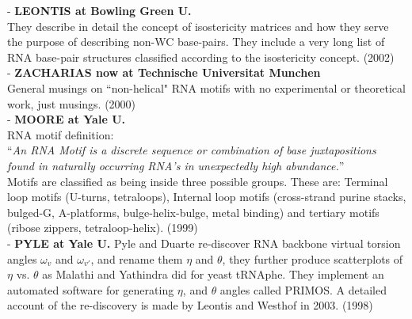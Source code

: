 - \textbf{LEONTIS at Bowling Green U.}\\
They describe in detail the concept of isostericity matrices and how
they serve the purpose of describing non-WC base-pairs.
They include a very long list of RNA base-pair structures classified
according to the isostericity concept. (2002)
\cite{leontis2002}\\

- \textbf{ZACHARIAS now at Technische Universitat Munchen}\\
General musings on ``non-helical" RNA motifs with no experimental or
theoretical work, just musings. (2000)
\cite{zacharias2000a}\\

- \textbf{MOORE at Yale U.}\\
RNA motif definition:\\
``\textit{An RNA Motif is a discrete sequence or combination of base
  juxtapositions found in naturally occurring RNA's in unexpectedly
  high abundance.}''\\
Motifs are classified as being inside three possible groups. These
are: Terminal loop motifs (U-turns, tetraloops), Internal loop
motifs (cross-strand purine stacks, bulged-G, A-platforms,
bulge-helix-bulge, metal binding) and tertiary motifs (ribose zippers,
tetraloop-helix). (1999)
\cite{moore1999}\\

- \textbf{PYLE at Yale U.}
Pyle and Duarte re-discover RNA backbone virtual torsion angles
$\omega_{v}$ and $\omega_{v'}$, and rename them $\eta$ and $\theta$,
they further produce scatterplots of $\eta$ vs. $\theta$ as Malathi
and Yathindra did for yeast tRNAphe. They implement an automated
software for generating $\eta$, and $\theta$ angles called PRIMOS.  A detailed
account of the re-discovery is made by Leontis and Westhof in 2003. (1998) 
\cite{duarte1998}\\




